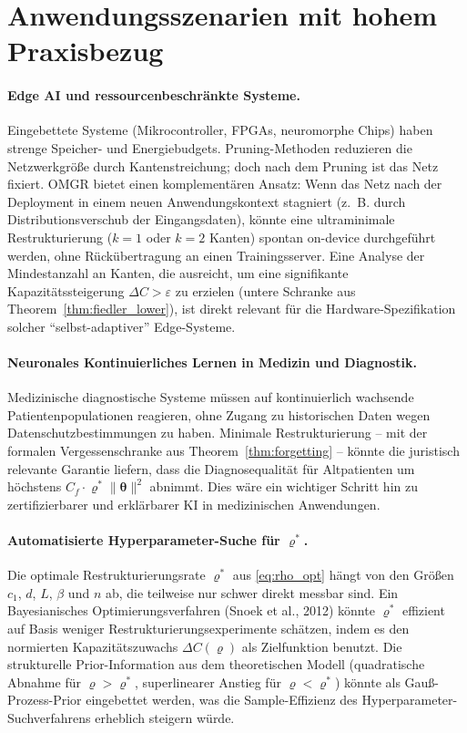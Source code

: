 ﻿\documentclass[12pt, a4paper, openany]{report}
\newcommand{\eps}{\varepsilon}
\begin{document}
\section{Anwendungsszenarien mit hohem Praxisbezug}
\label{sec:outlook_applications}

\paragraph{Edge AI und ressourcenbeschränkte Systeme.}
Eingebettete Systeme (Mikrocontroller, FPGAs, neuromorphe Chips) haben
strenge Speicher- und Energiebudgets.  Pruning-Methoden reduzieren die
Netzwerkgröße durch Kantenstreichung; doch nach dem Pruning ist das Netz
fixiert.  OMGR bietet einen komplementären Ansatz: Wenn das Netz nach der
Deployment in einem neuen Anwendungskontext stagniert (z.~B. durch
Distributionsverschub der Eingangsdaten), könnte eine ultraminimale
Restrukturierung ($k = 1$ oder $k = 2$ Kanten) spontan on-device durchgeführt
werden, ohne Rückübertragung an einen Trainingsserver.  Eine Analyse der
Mindestanzahl an Kanten, die ausreicht, um eine signifikante
Kapazitätssteigerung $\Delta C > \eps$ zu erzielen (untere Schranke aus
Theorem~\ref{thm:fiedler_lower}), ist direkt relevant für die
Hardware-Spezifikation solcher ``selbst-adaptiver'' Edge-Systeme.

\paragraph{Neuronales Kontinuierliches Lernen in Medizin und Diagnostik.}
Medizinische diagnostische Systeme müssen auf kontinuierlich wachsende
Patientenpopulationen reagieren, ohne Zugang zu historischen Daten wegen
Datenschutzbestimmungen zu haben.  Minimale Restrukturierung -- mit der
formalen Vergessenschranke aus Theorem~\ref{thm:forgetting} -- könnte
die juristisch relevante Garantie liefern, dass die Diagnosequalität für
Altpatienten um höchstens $C_f \cdot \varrho^* \|\bm{\theta}\|^2$ abnimmt.
Dies wäre ein wichtiger Schritt hin zu zertifizierbarer und erklärbarer
KI in medizinischen Anwendungen.

\paragraph{Automatisierte Hyperparameter-Suche für $\varrho^*$.}
Die optimale Restrukturierungsrate $\varrho^*$ aus \eqref{eq:rho_opt}
hängt von den Größen $c_1$, $d$, $L$, $\beta$ und $n$ ab, die
teilweise nur schwer direkt messbar sind.  Ein Bayesianisches
Optimierungsverfahren (Snoek et al., 2012) könnte $\varrho^*$ effizient
auf Basis weniger Restrukturierungsexperimente schätzen, indem es den
normierten Kapazitätszuwachs $\Delta C(\varrho)$ als Zielfunktion
benutzt.  Die strukturelle Prior-Information aus dem theoretischen Modell
(quadratische Abnahme für $\varrho > \varrho^*$, superlinearer Anstieg
für $\varrho < \varrho^*$) könnte als Gauß-Prozess-Prior eingebettet
werden, was die Sample-Effizienz des Hyperparameter-Suchverfahrens
erheblich steigern würde.
\end{document}
